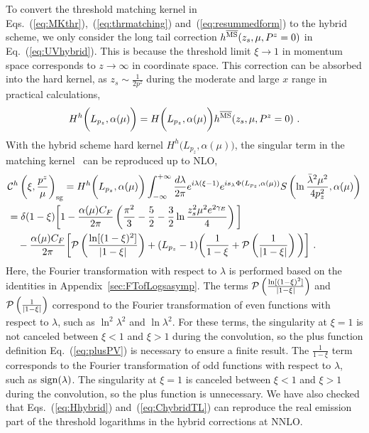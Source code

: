 \documentclass[a4paper,11pt]{article}
\begin{document}
To convert the threshold matching kernel in Eqs.~(\ref{eq:MKthr}),~(\ref{eq:thrmatching}) and~(\ref{eq:resummedform}) to the hybrid scheme, we only consider the long tail correction $h^{\rm \overline{MS}}(z_s,\mu,P^z=0)$ in Eq.~(\ref{eq:UVhybrid}). This is because the threshold limit $\xi \rightarrow 1$ in momentum space corresponds to $z \rightarrow \infty$ in coordinate space. This correction can be absorbed into the hard kernel, as $z_s \sim \frac{1}{2 p^z}$ during the moderate and large $x$ range in practical calculations, 
\begin{align}\label{eq:Hhybrid}
H^{h} \bigg(L_{p_z},\alpha(\mu)\bigg) = H\bigg(L_{p_z},\alpha(\mu)\bigg) h^{\rm \overline{MS}}(z_s,\mu,P^z=0) \ .
\end{align}
With the hybrid scheme hard kernel $H^{h} \bigg(L_{p_z},\alpha(\mu)\bigg)$, the singular term in the matching kernel~\cite{Ji:2020brr} can be reproduced up to NLO,
\begin{align}\label{eq:ChybridTL}
&{\cal C}^h\left(\xi,\frac{p^z}{\mu}\right)_{\rm sg}=H^h\bigg(L_{p_z},\alpha(\mu)\bigg) \int_{-\infty}^{+\infty} \frac{d \lambda}{2 \pi} e^{i \lambda (\xi-1)} e^{i s_{\lambda} \Phi(L_{p_z},\alpha(\mu))} S\left(\ln\frac{\bar{\lambda}^2\mu^2}{4 p_z^2},\alpha(\mu)\right) \nonumber \\ 
&=\delta(1-\xi)\bigg[1-\frac{\alpha(\mu) C_F}{2\pi}\left(\frac{\pi^2}{3}-\frac{5}{2}-\frac{3}{2}\ln\frac{z_s^2\mu^2 e^{2\gamma_E}}{4}\right)\bigg]\nonumber \\ 
&\quad -\frac{\alpha(\mu)C_F}{2\pi}\bigg[{\cal P}\left(\frac{\ln[ (1-\xi)^2]}{|1-\xi|}\right)+(L_{p_z}-1)\bigg(\frac{1}{1-\xi} +{\cal P}\left(\frac{1}{|1-\xi|} \right)\bigg)\bigg] \ .
\end{align}
Here, the Fourier transformation with respect to $\lambda$ is performed based on the identities in Appendix~\ref{sec:FTofLogsasymp}. The terms ${\cal P}\left(\frac{\ln[ (1-\xi)^2]}{|1-\xi|}\right)$ and ${\cal P}\left(\frac{1}{|1-\xi|} \right)$ correspond to the Fourier transformation of even functions with respect to $\lambda$, such as $\ln^2 \lambda^2$ and $\ln \lambda^2$. For these terms, the singularity at $\xi=1$ is not canceled between $\xi<1$ and $\xi>1$ during the convolution, so the plus function definition Eq.~(\ref{eq:plusPV}) is necessary to ensure a finite result. The $\frac{1}{1-\xi}$ term corresponds to the Fourier transformation of odd functions with respect to $\lambda$, such as ${\rm sign}(\lambda)$. The singularity at $\xi=1$ is canceled between $\xi<1$ and $\xi>1$ during the convolution, so the plus function is unnecessary. We have also checked that Eqs.~(\ref{eq:Hhybrid}) and~(\ref{eq:ChybridTL}) can reproduce the real emission part of the threshold logarithms in the hybrid corrections at NNLO. 
\end{document}
